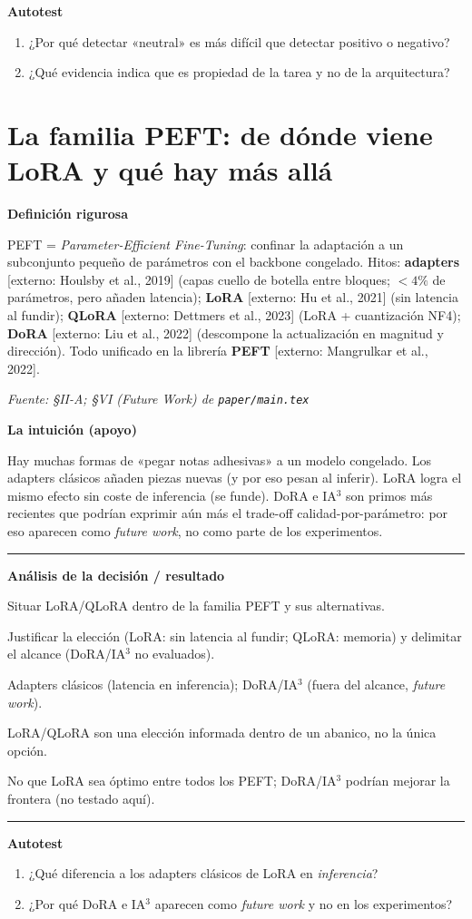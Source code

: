 \documentclass[11pt,a4paper]{article}
\newcommand{\nivel}[1]{\medskip\noindent\textbf{\textcolor{blue!45!black}{#1}}\par\nopagebreak\smallskip}
\newcommand{\fuente}[1]{\nopagebreak\par\hfill{\footnotesize\textit{Fuente: #1}}\par}
\newcommand{\externo}[1]{{\footnotesize\textcolor{red!55!black}{[externo: #1]}}}
\newenvironment{analisis}{%
  \medskip\par\noindent\rule{\linewidth}{0.4pt}\par\nopagebreak
  \textbf{Análisis de la decisión / resultado}\par\nopagebreak\smallskip
  \begin{description}[leftmargin=2.6cm,style=nextline,font=\bfseries]
}{%
  \end{description}\noindent\rule{\linewidth}{0.4pt}\par\medskip
}
\begin{document}
\nivel{Autotest}
\begin{enumerate}[nosep]
  \item ¿Por qué detectar «neutral» es más difícil que detectar positivo o negativo?
  \item ¿Qué evidencia indica que es propiedad de la tarea y no de la arquitectura?
\end{enumerate}

\section{La familia PEFT: de dónde viene LoRA y qué hay más allá}\label{sec:peftfamily}

\nivel{Definición rigurosa}
PEFT = \emph{Parameter-Efficient Fine-Tuning}: confinar la adaptación a un subconjunto pequeño de
parámetros con el backbone congelado. Hitos: \textbf{adapters} \externo{Houlsby et al., 2019}
(capas cuello de botella entre bloques; $<4\%$ de parámetros, pero añaden latencia);
\textbf{LoRA} \externo{Hu et al., 2021} (sin latencia al fundir); \textbf{QLoRA}
\externo{Dettmers et al., 2023} (LoRA + cuantización NF4); \textbf{DoRA} \externo{Liu et al., 2022}
(descompone la actualización en magnitud y dirección). Todo unificado en la librería
\textbf{PEFT} \externo{Mangrulkar et al., 2022}.
\fuente{\S II-A; \S VI (Future Work) de \texttt{paper/main.tex}}

\nivel{La intuición (apoyo)}
Hay muchas formas de «pegar notas adhesivas» a un modelo congelado. Los adapters clásicos añaden
piezas nuevas (y por eso pesan al inferir). LoRA logra el mismo efecto sin coste de inferencia
(se funde). DoRA e IA$^3$ son primos más recientes que podrían exprimir aún más el trade-off
calidad-por-parámetro: por eso aparecen como \emph{future work}, no como parte de los experimentos.

\begin{analisis}
  \item[Qué] Situar LoRA/QLoRA dentro de la familia PEFT y sus alternativas.
  \item[Por qué] Justificar la elección (LoRA: sin latencia al fundir; QLoRA: memoria) y delimitar el
        alcance (DoRA/IA$^3$ no evaluados).
  \item[Alternativas descartadas] Adapters clásicos (latencia en inferencia); DoRA/IA$^3$ (fuera del
        alcance, \emph{future work}).
  \item[Qué significa] LoRA/QLoRA son una elección informada dentro de un abanico, no la única
        opción.
  \item[Qué NO significa] No que LoRA sea óptimo entre todos los PEFT; DoRA/IA$^3$ podrían mejorar la
        frontera (no testado aquí).
\end{analisis}

\nivel{Autotest}
\begin{enumerate}[nosep]
  \item ¿Qué diferencia a los adapters clásicos de LoRA en \emph{inferencia}?
  \item ¿Por qué DoRA e IA$^3$ aparecen como \emph{future work} y no en los experimentos?
\end{enumerate}
\end{document}

